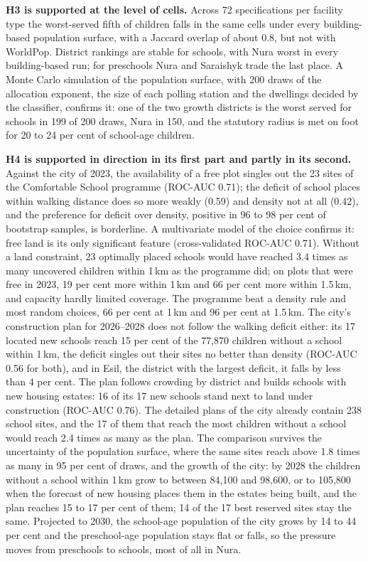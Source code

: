 \textbf{H3 is supported at the level of cells.} Across 72 specifications per facility type the worst-served fifth of children falls in the same cells under every building-based population surface, with a Jaccard overlap of about 0.8, but not with WorldPop. District rankings are stable for schools, with Nura worst in every building-based run; for preschools Nura and Saraishyk trade the last place. A Monte Carlo simulation of the population surface, with 200 draws of the allocation exponent, the size of each polling station and the dwellings decided by the classifier, confirms it: one of the two growth districts is the worst served for schools in 199 of 200 draws, Nura in 150, and the statutory radius is met on foot for 20 to 24 per cent of school-age children.

\textbf{H4 is supported in direction in its first part and partly in its second.} Against the city of 2023, the availability of a free plot singles out the 23 sites of the Comfortable School programme (ROC-AUC 0.71); the deficit of school places within walking distance does so more weakly (0.59) and density not at all (0.42), and the preference for deficit over density, positive in 96 to 98 per cent of bootstrap samples, is borderline. A multivariate model of the choice confirms it: free land is its only significant feature (cross-validated ROC-AUC 0.71). Without a land constraint, 23 optimally placed schools would have reached 3.4 times as many uncovered children within 1\,km as the programme did; on plots that were free in 2023, 19 per cent more within 1\,km and 66 per cent more within 1.5\,km, and capacity hardly limited coverage. The programme beat a density rule and most random choices, 66 per cent at 1\,km and 96 per cent at 1.5\,km. The city's construction plan for 2026--2028 does not follow the walking deficit either: its 17 located new schools reach 15 per cent of the 77,870 children without a school within 1\,km, the deficit singles out their sites no better than density (ROC-AUC 0.56 for both), and in Esil, the district with the largest deficit, it falls by less than 4 per cent. The plan follows crowding by district and builds schools with new housing estates: 16 of its 17 new schools stand next to land under construction (ROC-AUC 0.76). The detailed plans of the city already contain 238 school sites, and the 17 of them that reach the most children without a school would reach 2.4 times as many as the plan. The comparison survives the uncertainty of the population surface, where the same sites reach above 1.8 times as many in 95 per cent of draws, and the growth of the city: by 2028 the children without a school within 1\,km grow to between 84,100 and 98,600, or to 105,800 when the forecast of new housing places them in the estates being built, and the plan reaches 15 to 17 per cent of them; 14 of the 17 best reserved sites stay the same. Projected to 2030, the school-age population of the city grows by 14 to 44 per cent and the preschool-age population stays flat or falls, so the pressure moves from preschools to schools, most of all in Nura.

